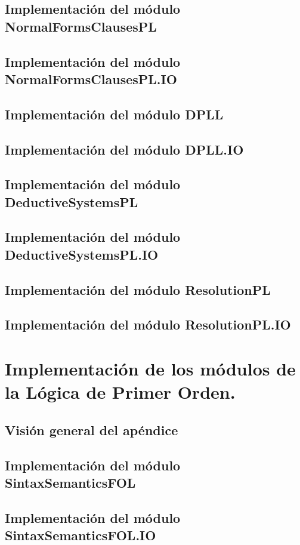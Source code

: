 \documentclass[fleqn, 11pt, a4paper]{book}
\begin{document}
\section{Implementación del módulo NormalFormsClausesPL}
\section{Implementación del módulo NormalFormsClausesPL.IO}
\section{Implementación del módulo DPLL}
\section{Implementación del módulo DPLL.IO}
\section{Implementación del módulo DeductiveSystemsPL}
\section{Implementación del módulo DeductiveSystemsPL.IO}
\section{Implementación del módulo ResolutionPL}
\section{Implementación del módulo ResolutionPL.IO}

\chapter{Implementación de los módulos de la Lógica de Primer Orden.}

\minitoc

\section{Visión general del apéndice}
\section{Implementación del módulo SintaxSemanticsFOL}
\section{Implementación del módulo SintaxSemanticsFOL.IO}
\end{document}
